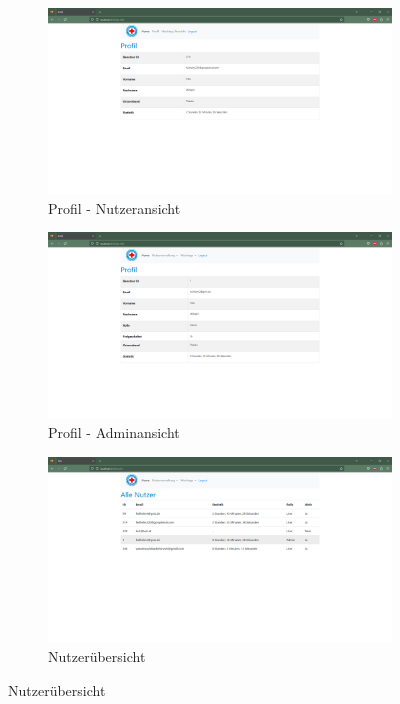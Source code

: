\documentclass[fontsize=12pt,openright,oneside,paper=a4,BCOR=1cm]{scrbook}
\begin{document}
\begin{figure}[H]
  \centering
  \begin{subfigure}[b]{0.4\linewidth}
    \includegraphics[width=\linewidth]{Anlagen/Anwendung/4ProfilNutzer.png}
    \caption{Profil - Nutzeransicht}
  \end{subfigure}
  \begin{subfigure}[b]{0.4\linewidth}
    \includegraphics[width=\linewidth]{Anlagen/Anwendung/4ProfilAdmin.png}
    \caption{Profil - Adminansicht}
  \end{subfigure}
  \begin{subfigure}[b]{0.4\linewidth}
    \includegraphics[width=\linewidth]{Anlagen/Anwendung/5Nutzerubersicht.png}
    \caption{Nutzerübersicht}
  \end{subfigure}
  \caption{Nutzerübersicht}
  \label{fig:anwendung-nutzerubersicht}
\end{figure}
\end{document}
